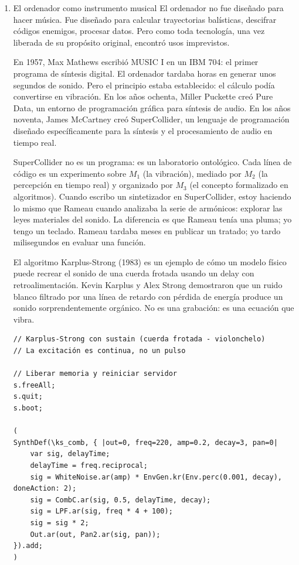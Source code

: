 \documentclass[14pt, a4paper]{article}
\begin{document}
\begin{enumerate}
\item El ordenador como instrumento musical
\label{ordenador-instrumento}
El ordenador no fue diseñado para hacer música. Fue diseñado para
calcular trayectorias balísticas, descifrar códigos enemigos, procesar
datos. Pero como toda tecnología, una vez liberada de su propósito
original, encontró usos imprevistos.

En 1957, Max Mathews escribió MUSIC I en un IBM 704: el primer
programa de síntesis digital. El ordenador tardaba horas en generar
unos segundos de sonido. Pero el principio estaba establecido: el
cálculo podía convertirse en vibración. En los años ochenta, Miller
Puckette creó Pure Data, un entorno de programación gráfica para
síntesis de audio. En los años noventa, James McCartney creó
SuperCollider, un lenguaje de programación diseñado específicamente
para la síntesis y el procesamiento de audio en tiempo real.

SuperCollider no es un programa: es un laboratorio ontológico. Cada
línea de código es un experimento sobre \(M_1\) (la vibración), mediado
por \(M_2\) (la percepción en tiempo real) y organizado por \(M_3\) (el
concepto formalizado en algoritmos). Cuando escribo un sintetizador en
SuperCollider, estoy haciendo lo mismo que Rameau cuando analizaba la
serie de armónicos: explorar las leyes materiales del sonido. La
diferencia es que Rameau tenía una pluma; yo tengo un teclado.
Rameau tardaba meses en publicar un tratado; yo tardo milisegundos en
evaluar una función.

El algoritmo Karplus-Strong (1983) es un ejemplo de cómo un modelo
físico puede recrear el sonido de una cuerda frotada usando un delay
con retroalimentación. Kevin Karplus y Alex Strong demostraron que un
ruido blanco filtrado por una línea de retardo con pérdida de energía
produce un sonido sorprendentemente orgánico. No es una grabación: es
una ecuación que vibra.

\begin{verbatim}
// Karplus-Strong con sustain (cuerda frotada - violonchelo)
// La excitación es continua, no un pulso

// Liberar memoria y reiniciar servidor
s.freeAll;
s.quit;
s.boot;

(
SynthDef(\ks_comb, { |out=0, freq=220, amp=0.2, decay=3, pan=0|
    var sig, delayTime;
    delayTime = freq.reciprocal;
    sig = WhiteNoise.ar(amp) * EnvGen.kr(Env.perc(0.001, decay), doneAction: 2);
    sig = CombC.ar(sig, 0.5, delayTime, decay);
    sig = LPF.ar(sig, freq * 4 + 100);
    sig = sig * 2;
    Out.ar(out, Pan2.ar(sig, pan));
}).add;
)


\end{verbatim}
\end{enumerate}
\end{document}
